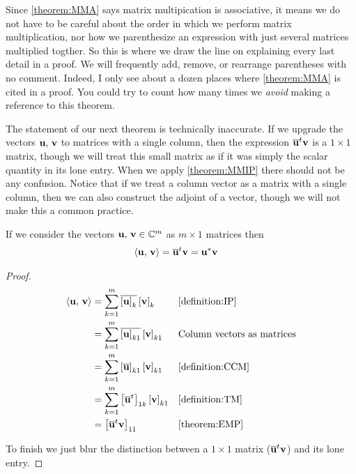 \documentclass{ximera}
\begin{document}
Since \ref{theorem:MMA} says matrix multipication is associative, it
means we do not have to be careful about the order in which we perform
matrix multiplication, nor how we parenthesize an expression with just
several matrices multiplied togther.  So this is where we draw the
line on explaining every last detail in a proof.  We will frequently
add, remove, or rearrange parentheses with no comment.  Indeed, I only
see about a dozen places where \ref{theorem:MMA} is cited in a proof.
You could try to count how many times we \textit{avoid} making a
reference to this theorem.

The statement of our next theorem is technically inaccurate.  If we
upgrade the vectors $\mathbf{u},\,\mathbf{v}$ to matrices with a single
column, then the expression $\overline{\mathbf{u}}^{t}\mathbf{v}$
is a $1\times 1$ matrix, though we will treat this small matrix as if
it was simply the scalar quantity in its lone entry.  When we apply
\ref{theorem:MMIP} there should not be any confusion.  Notice that if
we treat a column vector as a matrix with a single column, then we can
also construct the adjoint of a vector, though we will not make this a
common practice.

\begin{theorem}
\label{theorem:MMIP}

If we consider the vectors $\mathbf{u},\,\mathbf{v}\in\mathbb{C}^{m}$ as $m\times 1$ matrices then
\begin{align*}
  \left\langle\mathbf{u},\,\mathbf{v}\right\rangle
  &=\overline{\mathbf{u}}^{t}\mathbf{v}
    =\mathbf{u}^\ast\mathbf{v}
\end{align*}

\begin{proof}
  
  \begin{align*}
    \left\langle\mathbf{u},\,\mathbf{v}\right\rangle
    &=\sum_{k=1}^{m}\overline{\left\lbrack\mathbf{u}\right\rbrack_{k}}\left\lbrack\mathbf{v}\right\rbrack_{k}
    &&\ref{definition:IP}\\
    &=\sum_{k=1}^{m}\overline{\left\lbrack\mathbf{u}\right\rbrack_{k1}}\left\lbrack\mathbf{v}\right\rbrack_{k1}
    &&\text{Column vectors as matrices}\\
    &=\sum_{k=1}^{m}\left\lbrack\overline{\mathbf{u}}\right\rbrack_{k1}\left\lbrack\mathbf{v}\right\rbrack_{k1}
    &&\ref{definition:CCM}\\
    &=\sum_{k=1}^{m}\left\lbrack\overline{\mathbf{u}}^{t}\right\rbrack_{1k}\left\lbrack\mathbf{v}\right\rbrack_{k1}
    &&\ref{definition:TM}\\
    &=\left\lbrack\overline{\mathbf{u}}^{t}\mathbf{v}\right\rbrack_{11}
    &&\ref{theorem:EMP}\\
  \end{align*}

  To finish we just blur the distinction between a $1\times 1$ matrix ($\overline{\mathbf{u}}^{t}\mathbf{v}$) and its lone entry.
  
\end{proof}
\end{theorem}
\end{document}
